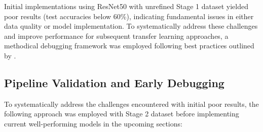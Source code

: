 \documentclass[a4paper,12pt]{report}
\begin{document}
Initial implementations using ResNet50 with unrefined Stage 1 dataset yielded poor results (test accuracies below 60\%), indicating fundamental issues in either data quality or model implementation. To systematically address these challenges and improve performance for subsequent transfer learning approaches, a methodical debugging framework was employed following best practices outlined by \citep{karpathy2019recipe}.

\subsection{Pipeline Validation and Early Debugging}

To systematically address the challenges encountered with initial poor results, the following approach was employed with Stage 2 dataset before implementing current well-performing models in the upcoming sections:
\end{document}
